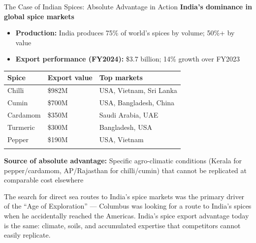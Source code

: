 \documentclass[
  ignorenonframetext,
  aspectratio=169,
]{beamer}
\makeatletter
\providecommand{\tightlist}{%
  \setlength{\itemsep}{0pt}\setlength{\parskip}{0pt}}
\let\quarto@originallabel\label
\DeclareRobustCommand*{\label}[1]{\quarto@originallabel{#1}}
\makeatother
\begin{document}
\begin{frame}{The Case of Indian Spices: Absolute Advantage in Action}
\label{the-case-of-indian-spices-absolute-advantage-in-action}
\textbf{India's dominance in global spice markets}

\begin{itemize}
\tightlist
\item
  \textbf{Production:} India produces 75\% of world's spices by volume;
  50\%+ by value
\item
  \textbf{Export performance (FY2024):} \$3.7 billion; 14\% growth over
  FY2023
\end{itemize}

\begin{longtable}[]{@{}lll@{}}
\toprule\noalign{}
Spice & Export value & Top markets \\
\midrule\noalign{}
\endhead
Chilli & \$982M & USA, Vietnam, Sri Lanka \\
Cumin & \$700M & USA, Bangladesh, China \\
Cardamom & \$350M & Saudi Arabia, UAE \\
Turmeric & \$300M & Bangladesh, USA \\
Pepper & \$190M & USA, Vietnam \\
\bottomrule\noalign{}
\end{longtable}

\textbf{Source of absolute advantage:} Specific agro-climatic conditions
(Kerala for pepper/cardamom, AP/Rajasthan for chilli/cumin) that cannot
be replicated at comparable cost elsewhere

The search for direct sea routes to India's spice markets was the
primary driver of the ``Age of Exploration'' --- Columbus was looking
for a route to India's spices when he accidentally reached the Americas.
India's spice export advantage today is the same: climate, soils, and
accumulated expertise that competitors cannot easily replicate.
\end{frame}
\end{document}
